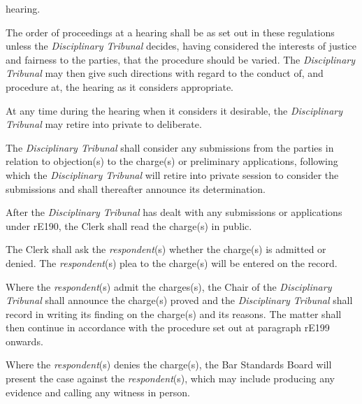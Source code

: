 hearing.\ln
{}\par
{}
The order of proceedings at a hearing shall be as set out in these
regulations unless the \emph{Disciplinary Tribunal} decides, having
considered the interests of justice and fairness to the parties, that
the procedure should be varied. The \emph{Disciplinary Tribunal} may
then give such directions with regard to the conduct of, and procedure
at, the hearing as it considers appropriate.\\
\par
At any time during the hearing when it considers it desirable,
the \emph{Disciplinary Tribunal} may retire into private to
deliberate.\\
\par
The \emph{Disciplinary Tribunal} shall consider any submissions from the
parties in relation to objection(s) to the charge(s) or preliminary
applications, following which the \emph{Disciplinary Tribunal} will
retire into private session to consider the submissions and shall
thereafter announce its determination.\\
\par
After the \emph{Disciplinary Tribunal} has dealt with any submissions or
applications under rE190, the Clerk shall read the charge(s) in
public.\\
\par
The Clerk shall ask the \emph{respondent}(s) whether the charge(s) is
admitted or denied. The \emph{respondent}(s) plea to the charge(s) will
be entered on the record.\\
\par
Where the \emph{respondent}(s) admit the charges(s), the Chair of
the\emph{ Disciplinary Tribunal} shall announce the charge(s) proved and
the \emph{Disciplinary Tribunal} shall record in writing its finding on
the charge(s) and its reasons. The matter shall then continue in
accordance with the procedure set out at paragraph rE199 onwards.\\
\par
Where the \emph{respondent}(s) denies the charge(s), the Bar Standards
Board will present the case against the \emph{respondent}(s), which may
include producing any evidence and calling any witness in person.\\
\par
